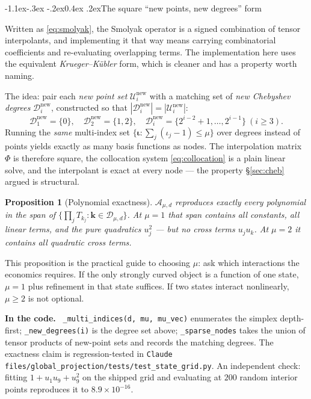\documentclass[10pt,a4paper]{article}
\makeatletter
\theoremstyle{definition}
\theoremstyle{plain}
\newtheorem{prop}[defn]{Proposition}
\theoremstyle{remark}
\newenvironment{codehint}%
  {\par\vspace{2pt}\begin{framed}\noindent\small\textcolor{codeblue}{\textbf{In the code.}}\ }%
  {\end{framed}\vspace{2pt}}
\newcommand{\file}[1]{\textcolor{codeblue}{\texttt{#1}}}
\newcommand{\code}[1]{\texttt{#1}}
\newcommand{\Tcheb}{T}
\renewcommand\subsection{\@startsection{subsection}{2}{\z@}%
  {-1.1ex\@plus -.3ex \@minus -.2ex}{0.4ex \@plus .2ex}{\normalfont\normalsize\bfseries}}
\makeatother
\begin{document}
\subsection{The square ``new points, new degrees'' form}

Written as \eqref{eq:smolyak}, the Smolyak operator is a signed combination of tensor
interpolants, and implementing it that way means carrying combinatorial coefficients and
re-evaluating overlapping terms. The implementation here uses the equivalent
\emph{Krueger--Kübler} form, which is cleaner and has a property worth naming.

The idea: pair each \emph{new point set} $\mathcal{U}^{\mathrm{new}}_i$ with a matching set of
\emph{new Chebyshev degrees} $\mathcal{D}^{\mathrm{new}}_i$, constructed so that
$|\mathcal{D}^{\mathrm{new}}_i| = |\mathcal{U}^{\mathrm{new}}_i|$:
\begin{equation}
  \mathcal{D}^{\mathrm{new}}_1=\{0\},\quad
  \mathcal{D}^{\mathrm{new}}_2=\{1,2\},\quad
  \mathcal{D}^{\mathrm{new}}_i = \{2^{i-2}+1,\dots,2^{i-1}\}\ (i\ge 3).
\end{equation}
Running the \emph{same} multi-index set $\{\bm{\iota}:\sum_j(\iota_j-1)\le\mu\}$ over degrees
instead of points yields exactly as many basis functions as nodes. The interpolation matrix
$\Phi$ is therefore square, the collocation system \eqref{eq:collocation} is a plain linear
solve, and the interpolant is exact at every node --- the property \S\ref{sec:cheb} argued is
structural.

\begin{prop}[Polynomial exactness]
$\mathcal{A}_{\mu,d}$ reproduces exactly every polynomial in the span of
$\{\prod_j \Tcheb_{k_j} : \bm{k}\in \mathcal{D}_{\mu,d}\}$. At $\mu=1$ that span contains
all constants, all linear terms, and the pure quadratics $u_j^2$ --- but \emph{no} cross
terms $u_ju_k$. At $\mu=2$ it contains all quadratic cross terms.
\end{prop}

\noindent This proposition is the practical guide to choosing $\mu$: ask which interactions
the economics requires. If the only strongly curved object is a function of one state, $\mu=1$
plus refinement in that state suffices. If two states interact nonlinearly, $\mu\ge2$ is not
optional.

\begin{codehint}
\code{\_multi\_indices(d, mu, mu\_vec)} enumerates the simplex depth-first;
\code{\_new\_degrees(i)} is the degree set above; \code{\_sparse\_nodes} takes the union of
tensor products of new-point sets and records the matching degrees. The exactness claim is
regression-tested in \file{Claude files/global\_projection/tests/test\_state\_grid.py}. An
independent check: fitting $1+u_1u_9+u_9^2$ on the shipped grid and evaluating at $200$
random interior points reproduces it to $8.9\times10^{-16}$.
\end{codehint}
\end{document}
